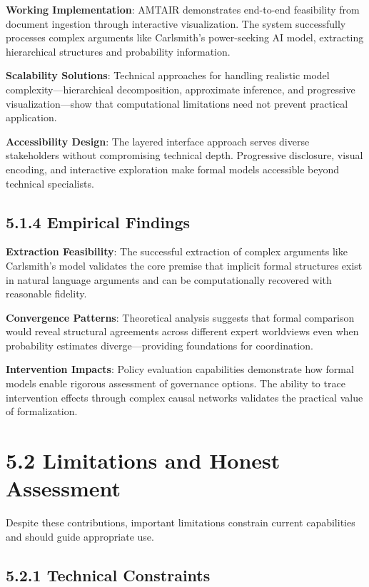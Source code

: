 \documentclass[
  11pt,
  letterpaper,
]{book}
\begin{document}
\textbf{Working Implementation}: AMTAIR demonstrates end-to-end
feasibility from document ingestion through interactive visualization.
The system successfully processes complex arguments like Carlsmith's
power-seeking AI model, extracting hierarchical structures and
probability information.

\textbf{Scalability Solutions}: Technical approaches for handling
realistic model complexity---hierarchical decomposition, approximate
inference, and progressive visualization---show that computational
limitations need not prevent practical application.

\textbf{Accessibility Design}: The layered interface approach serves
diverse stakeholders without compromising technical depth. Progressive
disclosure, visual encoding, and interactive exploration make formal
models accessible beyond technical specialists.

\subsection{5.1.4 Empirical Findings}\label{sec-empirical-findings}

\textbf{Extraction Feasibility}: The successful extraction of complex
arguments like Carlsmith's model validates the core premise that
implicit formal structures exist in natural language arguments and can
be computationally recovered with reasonable fidelity.

\textbf{Convergence Patterns}: Theoretical analysis suggests that formal
comparison would reveal structural agreements across different expert
worldviews even when probability estimates diverge---providing
foundations for coordination.

\textbf{Intervention Impacts}: Policy evaluation capabilities
demonstrate how formal models enable rigorous assessment of governance
options. The ability to trace intervention effects through complex
causal networks validates the practical value of formalization.

\section{5.2 Limitations and Honest
Assessment}\label{sec-limitations-assessment}

Despite these contributions, important limitations constrain current
capabilities and should guide appropriate use.

\subsection{5.2.1 Technical
Constraints}\label{sec-technical-constraints}
\end{document}

